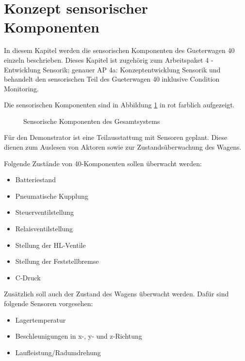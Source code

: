\section{Konzept sensorischer Komponenten}
In diesem Kapitel werden die sensorischen Komponenten des \gls{Gueterwagen 40} einzeln beschrieben. Dieses Kapitel ist zugehörig zum Arbeitspaket 4 - Entwicklung Sensorik; genauer AP 4a: Konzeptentwicklung Sensorik und behandelt den sensorischen Teil des \gls{Gueterwagen 40} inklusive Condition Monitoring.\par
Die sensorischen Komponenten sind in Abbildung \ref{fig:sKomp} in rot farblich aufgezeigt.
\begin{figure}[hbt]
    \centering
    
    \caption{Sensorische Komponenten des Gesamtsystems}
    \label{fig:sKomp}
\end{figure}
Für den \gls{Demonstrator} ist eine Teilausstattung mit Sensoren geplant. Diese dienen zum Auslesen von Aktoren sowie zur Zustandsüberwachung des Wagens.\par
Folgende Zustände von \gls{40-Komponenten} sollen überwacht werden:
\begin{itemize}
    \item Batteriestand
    \item Pneumatische Kupplung
    \item Steuerventilstellung
    \item Relaisventilstellung
    \item Stellung der \gls{HL}-Ventile
    \item Stellung der Feststellbremse
    \item C-Druck
\end{itemize}
Zusätzlich soll auch der Zustand des Wagens überwacht werden. Dafür sind folgende Sensoren vorgesehen:
\begin{itemize}
    \item Lagertemperatur
    \item Beschleunigungen in x-, y- und z-Richtung
    \item Laufleistung/Radumdrehung
\end{itemize}

\begin{comment}
\subsection{Konzept}
Condition Monitoring\\
Laderaumtemperatur\\
Türüberwachung\\
Stöße\\
Flachstellendetektion\\
Geschwindikeit\\
Laufleistung\\
Bremsbelag\\
Temperaturen\\
Batteriestand
\end{comment}
